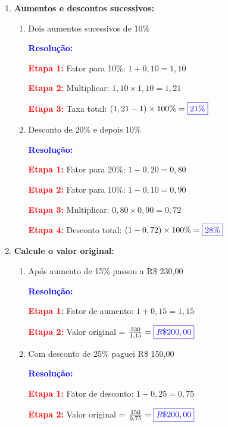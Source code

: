 \documentclass[11pt]{article}
\newcommand{\respostaNum}[1]{\textcolor{blue}{\boxed{#1}}}
\newcommand{\resolucao}{\textbf{\textcolor{blue}{Resolução:}}}
\begin{document}
\begin{multicols}{2}
\begin{enumerate}[leftmargin=*, start=9]

\item \textbf{Aumentos e descontos sucessivos:}

\begin{enumerate}[label=\alph*)]
\item Dois aumentos sucessivos de 10\%

\resolucao

\textbf{\textcolor{red}{Etapa 1:}} Fator para 10\%: $1 + 0,10 = 1,10$

\textbf{\textcolor{red}{Etapa 2:}} Multiplicar: $1,10 \times 1,10 = 1,21$

\textbf{\textcolor{red}{Etapa 3:}} Taxa total: $(1,21 - 1) \times 100\% = \respostaNum{21\%}$

\item Desconto de 20\% e depois 10\%

\resolucao

\textbf{\textcolor{red}{Etapa 1:}} Fator para 20\%: $1 - 0,20 = 0,80$

\textbf{\textcolor{red}{Etapa 2:}} Fator para 10\%: $1 - 0,10 = 0,90$

\textbf{\textcolor{red}{Etapa 3:}} Multiplicar: $0,80 \times 0,90 = 0,72$

\textbf{\textcolor{red}{Etapa 4:}} Desconto total: $(1 - 0,72) \times 100\% = \respostaNum{28\%}$
\end{enumerate}

\item \textbf{Calcule o valor original:}

\begin{enumerate}[label=\alph*)]
\item Após aumento de 15\% passou a R\$ 230,00

\resolucao

\textbf{\textcolor{red}{Etapa 1:}} Fator de aumento: $1 + 0,15 = 1,15$

\textbf{\textcolor{red}{Etapa 2:}} Valor original = $\frac{230}{1,15} = \respostaNum{R\$ 200,00}$

\item Com desconto de 25\% paguei R\$ 150,00

\resolucao

\textbf{\textcolor{red}{Etapa 1:}} Fator de desconto: $1 - 0,25 = 0,75$

\textbf{\textcolor{red}{Etapa 2:}} Valor original = $\frac{150}{0,75} = \respostaNum{R\$ 200,00}$
\end{enumerate}


\end{enumerate}
\end{multicols}
\end{document}
